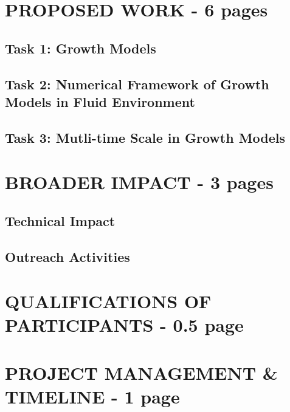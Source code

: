 \documentclass[12pt]{article}
\begin{document}
\section{PROPOSED WORK - 6 pages}

\subsection{Task 1: Growth Models}


\subsection{Task 2: Numerical Framework of Growth Models in Fluid Environment}


\subsection{Task 3: Mutli-time Scale in Growth Models}


\section{BROADER IMPACT - 3 pages}

\subsection{Technical Impact}

\subsection{Outreach Activities}


\section{QUALIFICATIONS OF PARTICIPANTS - 0.5 page}

\section{PROJECT MANAGEMENT \& TIMELINE - 1 page}
\end{document}
